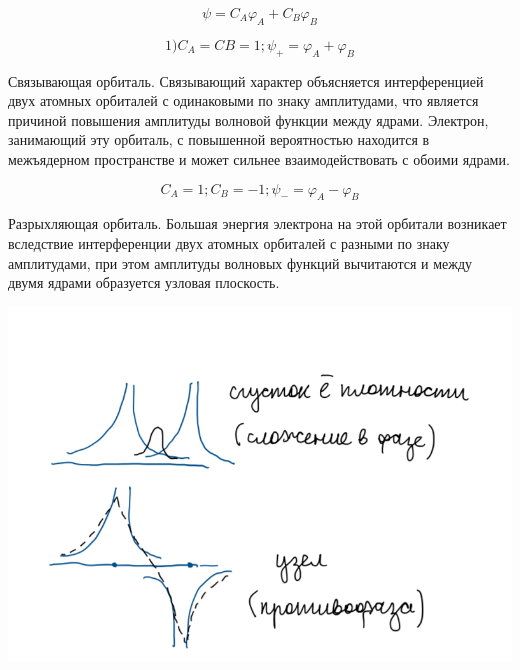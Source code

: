 $$\psi = C_A\varphi_A + C_B\varphi_B$$

$$1) C_A =  CB= 1;  \psi_+ = \varphi_A + \varphi_B$$

Связывающая орбиталь. Связывающий характер объясняется интерференцией двух атомных орбиталей с одинаковыми по знаку амплитудами, что является причиной повышения амплитуды волновой функции между ядрами. Электрон, занимающий эту орбиталь, с повышенной вероятностью находится в межъядерном пространстве и может сильнее взаимодействовать с обоими ядрами.

$$C_A =1; C_B = -1; \psi_- = \varphi_A-\varphi_B$$

Разрыхляющая орбиталь. Большая энергия электрона на этой орбитали
возникает вследствие интерференции двух атомных орбиталей с разными по
знаку амплитудами, при этом амплитуды волновых функций вычитаются и
между двумя ядрами образуется узловая плоскость.

\includegraphics[scale=0.7]{images/1v.png}
